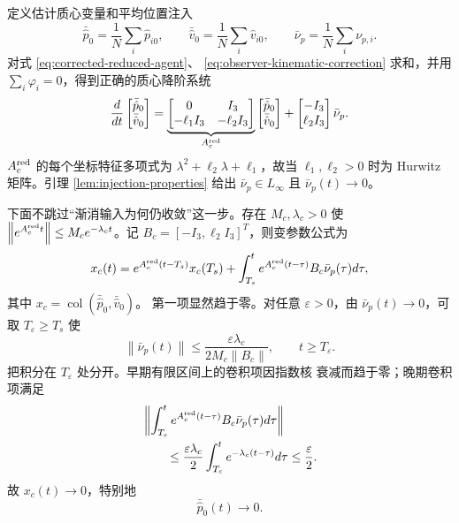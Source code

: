 \documentclass[UTF8,a4paper,12pt]{ctexart}
\DeclareMathOperator{\col}{col}
\newcommand{\norm}[1]{\left\lVert #1\right\rVert}
\begin{document}
定义估计质心变量和平均位置注入
\begin{equation}
 \bar{\hat p}_0=\frac1N\sum_i\hat p_{i0},\qquad
 \bar{\hat v}_0=\frac1N\sum_i\hat v_{i0},\qquad
 \bar\nu_p=\frac1N\sum_i\nu_{p,i}.
\end{equation}
对式 \eqref{eq:corrected-reduced-agent}、
\eqref{eq:observer-kinematic-correction} 求和，并用
$\sum_i\varphi_i=0$，得到正确的质心降阶系统
\begin{equation}
 \frac{d}{dt}
 \begin{bmatrix}\bar{\hat p}_0\\ \bar{\hat v}_0\end{bmatrix}
 =
 \underbrace{\begin{bmatrix}
 0&I_3\\-\ell_1I_3&-\ell_2I_3
 \end{bmatrix}}_{A_c^{\rm red}}
 \begin{bmatrix}\bar{\hat p}_0\\ \bar{\hat v}_0\end{bmatrix}
 +
 \begin{bmatrix}-I_3\\ \ell_2I_3\end{bmatrix}\bar\nu_p.
 \label{eq:corrected-centroid-system}
\end{equation}
$A_c^{\rm red}$ 的每个坐标特征多项式为
$\lambda^2+\ell_2\lambda+\ell_1$，故当
$\ell_1,\ell_2>0$ 时为 Hurwitz 矩阵。引理
\ref{lem:injection-properties} 给出
$\bar\nu_p\in L_\infty$ 且 $\bar\nu_p(t)\to0$。

下面不跳过``渐消输入为何仍收敛''这一步。存在 $M_c,\lambda_c>0$ 使
$\norm{e^{A_c^{\rm red}t}}\le M_ce^{-\lambda_ct}$。记
$B_c=[-I_3,\ell_2I_3]^T$，则变参数公式为
\begin{equation}
 x_c(t)=e^{A_c^{\rm red}(t-T_s)}x_c(T_s)
 +\int_{T_s}^te^{A_c^{\rm red}(t-\tau)}B_c\bar\nu_p(\tau)d\tau,
 \label{eq:centroid-voc}
\end{equation}
其中 $x_c=\col(\bar{\hat p}_0,\bar{\hat v}_0)$。
第一项显然趋于零。对任意 $\varepsilon>0$，由
$\bar\nu_p(t)\to0$，可取 $T_\varepsilon\ge T_s$ 使
\begin{equation}
 \norm{\bar\nu_p(t)}
 \le\frac{\varepsilon\lambda_c}{2M_c\norm{B_c}},\qquad
 t\ge T_\varepsilon.
\end{equation}
把积分在 $T_\varepsilon$ 处分开。早期有限区间上的卷积项因指数核
衰减而趋于零；晚期卷积项满足
\begin{align}
 &\norm{\int_{T_\varepsilon}^t
 e^{A_c^{\rm red}(t-\tau)}B_c\bar\nu_p(\tau)d\tau}\\
 &\qquad\le
 \frac{\varepsilon\lambda_c}{2}
 \int_{T_\varepsilon}^te^{-\lambda_c(t-\tau)}d\tau
 \le\frac\varepsilon2.
\end{align}
故 $x_c(t)\to0$，特别地
\begin{equation}
 \bar{\hat p}_0(t)\to0.
 \label{eq:estimated-centroid-zero}
\end{equation}
\end{document}
